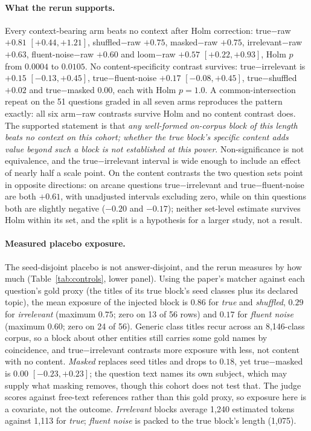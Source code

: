 \documentclass[10pt,twocolumn]{article}
\begin{document}
\paragraph{What the rerun supports.} Every context-bearing arm beats no context after Holm correction: true$-$raw $+0.81$ $[+0.44,+1.21]$, shuffled$-$raw $+0.75$, masked$-$raw $+0.75$, irrelevant$-$raw $+0.63$, fluent-noise$-$raw $+0.60$ and loom$-$raw $+0.57$ $[+0.22,+0.93]$, Holm $p$ from $0.0004$ to $0.0105$. No content-specificity contrast survives: true$-$irrelevant is $+0.15$ $[-0.13,+0.45]$, true$-$fluent-noise $+0.17$ $[-0.08,+0.45]$, true$-$shuffled $+0.02$ and true$-$masked $0.00$, each with Holm $p=1.0$. A common-intersection repeat on the 51 questions graded in all seven arms reproduces the pattern exactly: all six arm$-$raw contrasts survive Holm and no content contrast does. The supported statement is that \emph{any well-formed on-corpus block of this length beats no context on this cohort; whether the true block's specific content adds value beyond such a block is not established at this power}. Non-significance is not equivalence, and the true$-$irrelevant interval is wide enough to include an effect of nearly half a scale point. On the content contrasts the two question sets point in opposite directions: on arcane questions true$-$irrelevant and true$-$fluent-noise are both $+0.61$, with unadjusted intervals excluding zero, while on thin questions both are slightly negative ($-0.20$ and $-0.17$); neither set-level estimate survives Holm within its set, and the split is a hypothesis for a larger study, not a result.

\paragraph{Measured placebo exposure.} The seed-disjoint placebo is not answer-disjoint, and the rerun measures by how much (Table~\ref{tab:controls}, lower panel). Using the paper's matcher against each question's gold proxy (the titles of its true block's seed classes plus its declared topic), the mean exposure of the injected block is $0.86$ for \emph{true} and \emph{shuffled}, $0.29$ for \emph{irrelevant} (maximum $0.75$; zero on 13 of 56 rows) and $0.17$ for \emph{fluent noise} (maximum $0.60$; zero on 24 of 56). Generic class titles recur across an 8{,}146-class corpus, so a block about other entities still carries some gold names by coincidence, and true$-$irrelevant contrasts more exposure with less, not content with no content. \emph{Masked} replaces seed titles and drops to $0.18$, yet true$-$masked is $0.00$ $[-0.23,+0.23]$; the question text names its own subject, which may supply what masking removes, though this cohort does not test that. The judge scores against free-text references rather than this gold proxy, so exposure here is a covariate, not the outcome. \emph{Irrelevant} blocks average 1{,}240 estimated tokens against 1{,}113 for \emph{true}; \emph{fluent noise} is packed to the true block's length (1{,}075).
\end{document}
